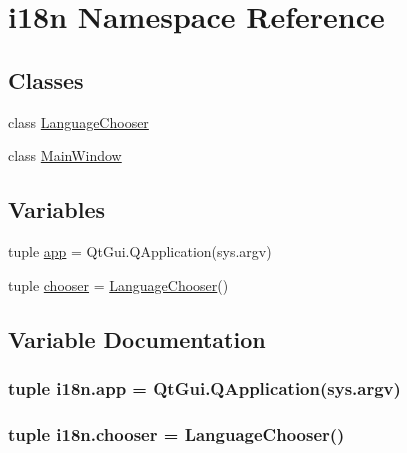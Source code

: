 \hypertarget{namespacei18n}{}\section{i18n Namespace Reference}
\label{namespacei18n}
\subsection*{Classes}
\begin{DoxyCompactItemize}
\item 
class \hyperlink{classi18n_1_1LanguageChooser}{Language\+Chooser}
\item 
class \hyperlink{classi18n_1_1MainWindow}{Main\+Window}
\end{DoxyCompactItemize}
\subsection*{Variables}
\begin{DoxyCompactItemize}
\item 
tuple \hyperlink{namespacei18n_ab3a23dc070c0eef5097a8c84cb8aa4fb}{app} = Qt\+Gui.\+Q\+Application(sys.\+argv)
\item 
tuple \hyperlink{namespacei18n_a685b4f9eea76b9e4d535beadf99b157d}{chooser} = \hyperlink{classi18n_1_1LanguageChooser}{Language\+Chooser}()
\end{DoxyCompactItemize}


\subsection{Variable Documentation}
\hypertarget{namespacei18n_ab3a23dc070c0eef5097a8c84cb8aa4fb}{}
\subsubsection[{app}]{\setlength{\rightskip}{0pt plus 5cm}tuple i18n.\+app = Qt\+Gui.\+Q\+Application(sys.\+argv)}\label{namespacei18n_ab3a23dc070c0eef5097a8c84cb8aa4fb}
\hypertarget{namespacei18n_a685b4f9eea76b9e4d535beadf99b157d}{}
\subsubsection[{chooser}]{\setlength{\rightskip}{0pt plus 5cm}tuple i18n.\+chooser = {\bf Language\+Chooser}()}\label{namespacei18n_a685b4f9eea76b9e4d535beadf99b157d}
